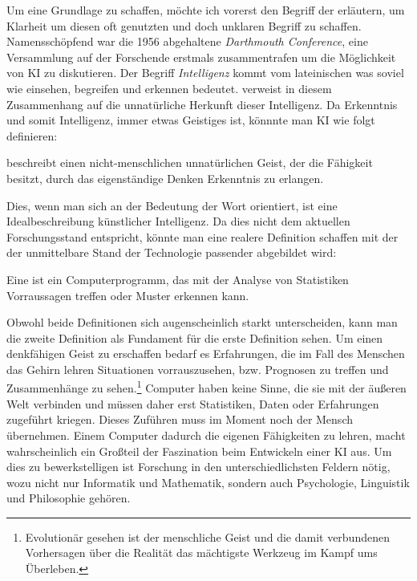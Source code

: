 \documentclass[12pt,german,ngerman]{report}
\begin{document}
    Um eine Grundlage zu schaffen, möchte ich vorerst den Begriff der 
    erläutern, um Klarheit um diesen oft genutzten und doch unklaren Begriff zu schaffen.
    Namensschöpfend war die 1956 abgehaltene \emph{Darthmouth Conference}\cite[57]{buchanan2005very}, 
    eine Versammlung auf der 
    Forschende erstmals zusammentrafen um die Möglichkeit von KI zu diskutieren.
    Der Begriff \emph{Intelligenz} kommt vom lateinischen  was soviel wie
    einsehen, begreifen und erkennen bedeutet.\cite{piaget2000psychologie}
     verweist in diesem Zusammenhang auf die unnatürliche Herkunft dieser Intelligenz.
    Da Erkenntnis und somit Intelligenz, immer etwas Geistiges ist\cite{duden2021erkenntnis}, könnnte
    man KI wie folgt definieren:
    \begin{displayquote}
         beschreibt einen nicht-menschlichen
        unnatürlichen Geist, der die Fähigkeit besitzt, 
        durch das eigenständige Denken Erkenntnis zu erlangen.
    \end{displayquote}
    Dies, wenn man sich an der Bedeutung der Wort orientiert, ist eine Idealbeschreibung künstlicher Intelligenz.
    Da dies nicht dem aktuellen Forschungsstand entspricht, könnte man eine realere Definition schaffen mit der der unmittelbare
    Stand der Technologie passender abgebildet wird:
    \begin{displayquote}
        Eine  ist ein Computerprogramm, das 
        mit der Analyse von Statistiken Vorraussagen treffen oder Muster erkennen kann.
    \end{displayquote}
    Obwohl beide Definitionen sich augenscheinlich starkt unterscheiden, kann man die zweite Definition als Fundament für
    die erste Definition sehen. Um einen denkfähigen Geist zu erschaffen bedarf es Erfahrungen, die im Fall des Menschen
    das Gehirn lehren Situationen vorrauszusehen, bzw. Prognosen zu treffen und Zusammenhänge zu sehen.\footnote{Evolutionär
    gesehen ist der menschliche Geist und die 
    damit verbundenen Vorhersagen über die Realität
    das mächtigste Werkzeug im Kampf ums Überleben.}
    Computer haben keine Sinne, die sie mit der äußeren Welt verbinden und 
    müssen daher erst Statistiken, Daten oder Erfahrungen zugeführt kriegen.
    Dieses Zuführen muss im Moment noch der Mensch übernehmen.
    Einem Computer dadurch die eigenen Fähigkeiten zu lehren, macht wahrscheinlich ein Großteil der Faszination
    beim Entwickeln einer KI aus. Um dies zu bewerkstelligen ist Forschung in den unterschiedlichsten Feldern nötig,
    wozu nicht nur Informatik und Mathematik, sondern auch Psychologie, Linguistik und Philosophie\cite{buchanan2005very} gehören.\\
\end{document}
